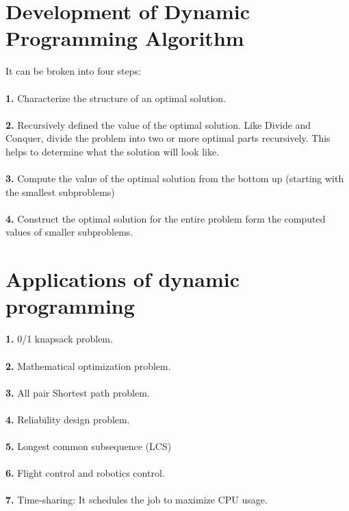 \documentclass[11pt]{article}
\begin{document}
\section*{Development of Dynamic Programming Algorithm}
It can be broken into four steps:\\\\
\textbf{1.} Characterize the structure of an optimal solution.\\\\
\textbf{2.} Recursively defined the value of the optimal solution. Like Divide and Conquer, divide the problem into two or more optimal parts recursively. This helps to determine what the solution will look like.\\\\
\textbf{3.} Compute the value of the optimal solution from the bottom up (starting with the smallest subproblems)\\\\
\textbf{4.} Construct the optimal solution for the entire problem form the computed values of smaller subproblems.\\ 

\section*{Applications of dynamic programming\\}

\textbf{1.} 0/1 knapsack problem.\\\\
\textbf{2.} Mathematical optimization problem.\\\\
\textbf{3.} All pair Shortest path problem.\\\\
\textbf{4.} Reliability design problem.\\\\
\textbf{5.} Longest common subsequence (LCS)\\\\
\textbf{6.} Flight control and robotics control.\\\\
\textbf{7.} Time-sharing: It schedules the job to maximize CPU usage.\\\\
\end{document}

